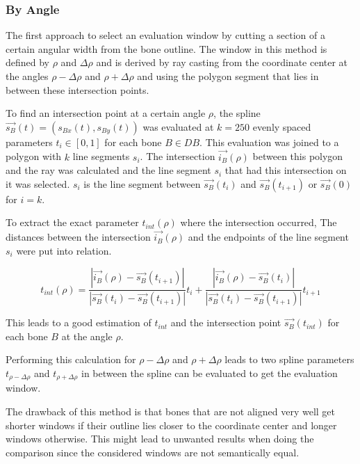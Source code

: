 \documentclass[pdftex,12pt,a4paper]{report}
\begin{document}
\subsubsection{By Angle}
\label{subsub:windowbyangle}

The first approach to select an evaluation window by cutting a section of a certain angular
width from the bone outline. The window in this method is defined by $\rho$ and $\Delta\rho$
and is derived by ray casting from the coordinate center at the angles $\rho - \Delta\rho$ and 
$\rho + \Delta\rho$ and using the polygon segment that lies in between these intersection points. 

To find an intersection point at a certain angle $\rho$, the spline $\vec{s_B}(t) = (s_{Bx}(t), s_{By}(t))$ was evaluated at $k=250$ evenly spaced
parameters $t_i \in [0,1]$ for each bone $B \in DB$. This evaluation was joined to a polygon
with $k$ line segments $s_i$. The intersection $\vec{i_B}(\rho)$ between this polygon and the ray was calculated and
the line segment $s_i$ that had this intersection on it was selected. $s_i$ is the line
segment between $\vec{s_B}(t_i)$ and $\vec{s_B}(t_{i+1})$ or $\vec{s_B}(0)$ for $i=k$.

To extract the exact parameter $t_{int}(\rho)$ where the intersection occurred, The distances
between the intersection $\vec{i_B}(\rho)$ and the endpoints of the line segment $s_i$ were put into relation.

\begin{equation}
t_{int}(\rho) =
\frac{|\vec{i_B}(\rho) - \vec{s_B}(t_{i+1})|}{|\vec{s_B}(t_i) - \vec{s_B}(t_{i+1})|} t_i +
\frac{|\vec{i_B}(\rho) - \vec{s_B}(t_i)|}{|\vec{s_B}(t_i) - \vec{s_B}(t_{i+1})|} t_{i+1}
\end{equation}

This leads to a good estimation of $t_{int}$ and the intersection point $\vec{s_B}(t_{int})$
for each bone $B$ at the angle $\rho$.

Performing this calculation for $\rho-\Delta\rho$ and $\rho+\Delta\rho$ leads to two spline
parameters $t_{\rho-\Delta\rho}$ and $t_{\rho+\Delta\rho}$ in between the spline can be 
evaluated to get the evaluation window.

The drawback of this method is that bones that are not aligned very well get shorter windows
if their outline lies closer to the coordinate center and longer windows otherwise. This 
might lead to unwanted results when doing the comparison since the considered windows are
not semantically equal. 
\end{document}
